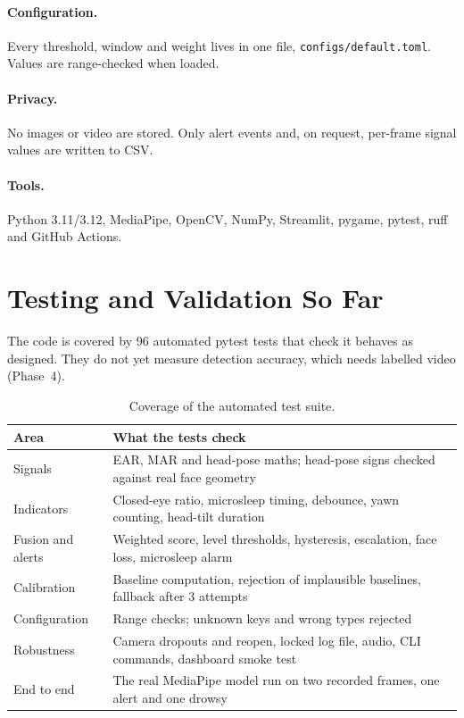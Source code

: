 \documentclass[12pt,a4paper]{article}
\newcommand{\code}[1]{\texttt{#1}}
\begin{document}
{\sloppy\paragraph{Configuration.} Every threshold, window and weight lives in one file, \code{configs/default.toml}. Values are range-checked when loaded.\par}

\paragraph{Privacy.} No images or video are stored. Only alert events and, on request, per-frame signal values are written to CSV.

\paragraph{Tools.} Python 3.11/3.12, MediaPipe, OpenCV, NumPy, Streamlit, pygame, pytest, ruff and GitHub Actions.

\section{Testing and Validation So Far}

The code is covered by 96 automated pytest tests that check it behaves as designed. They do not yet measure detection accuracy, which needs labelled video (Phase~4).

\begin{table}[htbp]
\centering
\caption{Coverage of the automated test suite.}
\label{tab:tests}
\begin{tabularx}{\textwidth}{lX}
\toprule
Area & What the tests check \\
\midrule
Signals & EAR, MAR and head-pose maths; head-pose signs checked against real face geometry \\
Indicators & Closed-eye ratio, microsleep timing, debounce, yawn counting, head-tilt duration \\
Fusion and alerts & Weighted score, level thresholds, hysteresis, escalation, face loss, microsleep alarm \\
Calibration & Baseline computation, rejection of implausible baselines, fallback after 3 attempts \\
Configuration & Range checks; unknown keys and wrong types rejected \\
Robustness & Camera dropouts and reopen, locked log file, audio, CLI commands, dashboard smoke test \\
End to end & The real MediaPipe model run on two recorded frames, one alert and one drowsy \\
\bottomrule
\end{tabularx}
\end{table}
\end{document}
